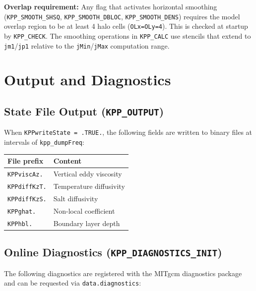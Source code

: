 \documentclass[12pt,letterpaper]{article}
\begin{document}
\begin{infobox}  
\textbf{Overlap requirement:} Any flag that activates horizontal  
smoothing (\texttt{KPP\_SMOOTH\_SHSQ}, \texttt{KPP\_SMOOTH\_DBLOC},  
\texttt{KPP\_SMOOTH\_DENS}) requires the model overlap region to be  
at least 4 halo cells (\texttt{OLx=OLy=4}). This is checked at  
startup by \texttt{KPP\_CHECK}. The smoothing operations in  
\texttt{KPP\_CALC} use stencils that extend to \texttt{jm1}/\texttt{jp1}  
relative to the \texttt{jMin}/\texttt{jMax} computation range.  
\end{infobox}  
  
\section{Output and Diagnostics}  
  
\subsection{State File Output (\texttt{KPP\_OUTPUT})}  
  
When \texttt{KPPwriteState = .TRUE.}, the following fields are written  
to binary files at intervals of \texttt{kpp\_dumpFreq}:  
  
\begin{center}  
\begin{tabular}{ll}  
\toprule  
\textbf{File prefix} & \textbf{Content} \\  
\midrule  
\texttt{KPPviscAz.}   & Vertical eddy viscosity \\  
\texttt{KPPdiffKzT.}  & Temperature diffusivity \\  
\texttt{KPPdiffKzS.}  & Salt diffusivity \\  
\texttt{KPPghat.}     & Non-local coefficient \\  
\texttt{KPPhbl.}      & Boundary layer depth \\  
\bottomrule  
\end{tabular}  
\end{center}  
  
\subsection{Online Diagnostics (\texttt{KPP\_DIAGNOSTICS\_INIT})}  
  
The following diagnostics are registered with the MITgcm diagnostics  
package and can be requested via \texttt{data.diagnostics}:  
  
\end{document}
